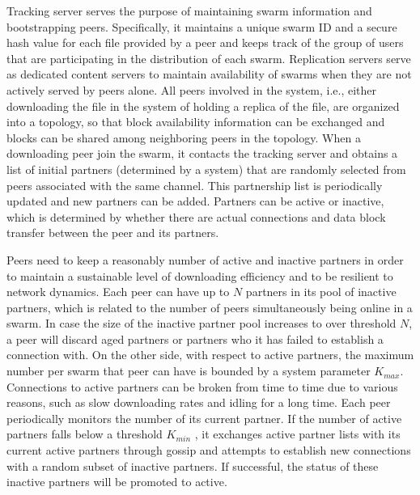\documentclass[conference]{IEEEtran}
\begin{document}
Tracking server serves the purpose of maintaining swarm information and bootstrapping peers.
Specifically, it maintains a unique swarm ID and a secure hash value for each file provided by a peer and keeps track of the group of users that are participating in the distribution of each swarm. 
Replication servers serve as dedicated content servers to maintain availability of swarms when they are not actively served by peers alone. 
All peers involved in the system, i.e., either downloading the file in the system of holding a replica of the file, are organized into a topology, so that block availability information can be exchanged and blocks can be shared among neighboring peers in the topology.
When a downloading peer join the swarm, it contacts the tracking server and obtains a list of initial partners (determined by a system) that are randomly selected from peers associated with the same channel.  
This partnership list is periodically updated and new partners can be added. 
Partners can be active or inactive, which is determined by whether there are actual connections and data block transfer between the peer and its partners.

Peers need to keep a reasonably number of active and inactive partners in order to maintain a sustainable level of downloading efficiency and to be resilient to network dynamics. 
Each peer can have up to $N$ partners in its pool of inactive partners, which is related to the number of peers simultaneously being online in a swarm.
In case the size of the inactive partner pool increases to over threshold $N$, a peer will discard aged partners or partners who it has failed to establish a connection with. 
On the other side, with respect to active partners, the maximum number per swarm that peer can have is bounded by a system parameter $K_{max}$.
Connections to active partners can be broken from time to time due to various reasons, such as slow downloading rates and idling for a long time.
Each peer periodically monitors the number of its current partner. 
If the number of active partners falls below a threshold $K_{min}$ , it exchanges active partner lists with its current active partners through gossip and attempts to establish new connections with a random subset of inactive partners.
If successful, the status of these inactive partners will be promoted to active. 
\end{document}
